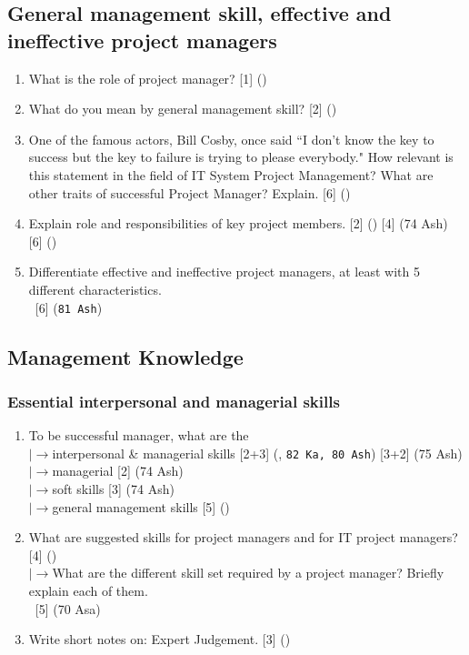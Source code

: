\documentclass[12pt]{article}
\newcommand{\lb}{\\$\left|\rightarrow\right.$}
\newcommand{\enter}{\\\textcolor{white}{1}}
\begin{document}
  \subsection{General management skill, effective and ineffective project managers}
    \begin{enumerate}
      \item What is the role of project manager? \hfill [1] ()
       \item What do you mean by general management skill? \hfill [2] ()
       
       \item One of the famous actors, Bill Cosby, once said ``I don't know the key to success but the key to failure is trying to please everybody." How relevant is this statement in the field of IT System Project Management? What are other traits of successful Project Manager? Explain. \hfill [6] ()

       \item Explain role and responsibilities of key project members. \hfill [2] () [4] (74 Ash) [6] ()

       \item Differentiate effective and ineffective project managers, at least with 5 different characteristics.
        \enter\hfill [6] (\texttt{81 Ash})
    \end{enumerate}

  \subsection{Management Knowledge}
    \subsubsection{Essential interpersonal and managerial skills}
      \begin{enumerate}
        \item To be successful manager, what are the
          \lb interpersonal \& managerial skills \hfill [2+3] (, \texttt{82 Ka, 80 Ash}) [3+2] (75 Ash)
          \lb managerial \hfill [2] (74 Ash)
          \lb soft skills \hfill [3] (74 Ash)
          \lb general management skills \hfill [5] ()

        \item What are suggested skills for project managers and for IT project managers? \hfill [4] ()
          \lb What are the different skill set required by a project manager? Briefly explain each of them.
          \enter\hfill [5] (70 Asa)

        \item Write short notes on: Expert Judgement. \hfill [3] ()
      \end{enumerate}
\end{document}
